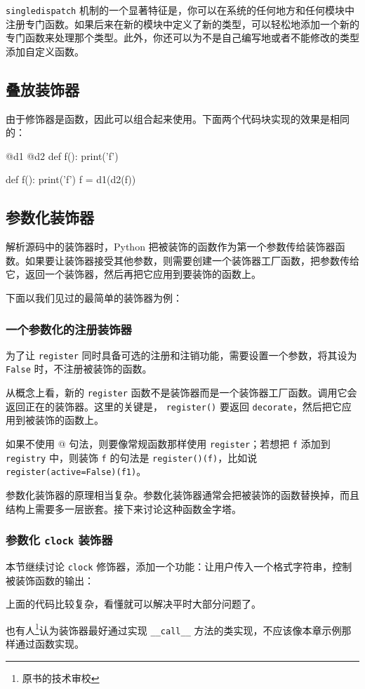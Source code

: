 \texttt{singledispatch} 机制的一个显著特征是，你可以在系统的任何地方和任何模块中注册专门函数。如果后来在新的模块中定义了新的类型，可以轻松地添加一个新的专门函数来处理那个类型。此外，你还可以为不是自己编写地或者不能修改的类型添加自定义函数。

\subsection{叠放装饰器}

由于修饰器是函数，因此可以组合起来使用。下面两个代码块实现的效果是相同的：
\begin{python}
@d1
@d2
def f():
    print('f')
\end{python}

\begin{python}
def f():
    print('f')
f = d1(d2(f))
\end{python}

\subsection{参数化装饰器}

解析源码中的装饰器时，Python 把被装饰的函数作为第一个参数传给装饰器函数。如果要让装饰器接受其他参数，则需要创建一个装饰器工厂函数，把参数传给它，返回一个装饰器，然后再把它应用到要装饰的函数上。

下面以我们见过的最简单的装饰器为例：



\subsubsection{一个参数化的注册装饰器}

为了让 \texttt{register} 同时具备可选的注册和注销功能，需要设置一个参数，将其设为 \texttt{False} 时，不注册被装饰的函数。



从概念上看，新的 \texttt{register} 函数不是装饰器而是一个装饰器工厂函数。调用它会返回正在的装饰器。这里的关键是， \texttt{register()} 要返回 \texttt{decorate}，然后把它应用到被装饰的函数上。

如果不使用 @ 句法，则要像常规函数那样使用 \texttt{register}；若想把 \texttt{f} 添加到 \texttt{registry} 中，则装饰 \texttt{f} 的句法是 \texttt{register()(f)}，比如说 \texttt{register(active=False)(f1)}。

参数化装饰器的原理相当复杂。参数化装饰器通常会把被装饰的函数替换掉，而且结构上需要多一层嵌套。接下来讨论这种函数金字塔。

\subsubsection{参数化 \texttt{clock} 装饰器}

本节继续讨论 \texttt{clock} 修饰器，添加一个功能：让用户传入一个格式字符串，控制被装饰函数的输出：



上面的代码比较复杂，看懂就可以解决平时大部分问题了。

也有人\footnote{原书的技术审校}认为装饰器最好通过实现 \texttt{\_\_call\_\_} 方法的类实现，不应该像本章示例那样通过函数实现。

\newpage